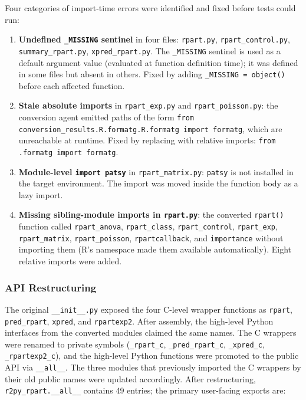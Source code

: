 \documentclass[12pt]{article}
\begin{document}
Four categories of import-time errors were identified and fixed before tests could run:
\begin{enumerate}
\item \textbf{Undefined \texttt{\_MISSING} sentinel} in four files: \texttt{rpart.py}, \texttt{rpart\_control.py}, \texttt{summary\_rpart.py}, \texttt{xpred\_rpart.py}. The \texttt{\_MISSING} sentinel is used as a default argument value (evaluated at function definition time); it was defined in some files but absent in others. Fixed by adding \texttt{\_MISSING = object()} before each affected function.
\item \textbf{Stale absolute imports} in \texttt{rpart\_exp.py} and \texttt{rpart\_poisson.py}: the conversion agent emitted paths of the form \texttt{from conversion\_results.R.formatg.R.formatg import formatg}, which are unreachable at runtime. Fixed by replacing with relative imports: \texttt{from .formatg import formatg}.
\item \textbf{Module-level \texttt{import patsy}} in \texttt{rpart\_matrix.py}: \texttt{patsy} is not installed in the target environment. The import was moved inside the function body as a lazy import.
\item \textbf{Missing sibling-module imports in \texttt{rpart.py}}: the converted \texttt{rpart()} function called \texttt{rpart\_anova}, \texttt{rpart\_class}, \texttt{rpart\_control}, \texttt{rpart\_exp}, \texttt{rpart\_matrix}, \texttt{rpart\_poisson}, \texttt{rpartcallback}, and \texttt{importance} without importing them (R's namespace made them available automatically). Eight relative imports were added.
\end{enumerate}

\subsubsection{API Restructuring}

The original \texttt{\_\_init\_\_.py} exposed the four C-level wrapper functions as \texttt{rpart}, \texttt{pred\_rpart}, \texttt{xpred}, and \texttt{rpartexp2}. After assembly, the high-level Python interfaces from the converted modules claimed the same names. The C wrappers were renamed to private symbols (\texttt{\_rpart\_c}, \texttt{\_pred\_rpart\_c}, \texttt{\_xpred\_c}, \texttt{\_rpartexp2\_c}), and the high-level Python functions were promoted to the public API via \texttt{\_\_all\_\_}. The three modules that previously imported the C wrappers by their old public names were updated accordingly. After restructuring, \texttt{r2py\_rpart.\_\_all\_\_} contains 49 entries; the primary user-facing exports are:
\end{document}
